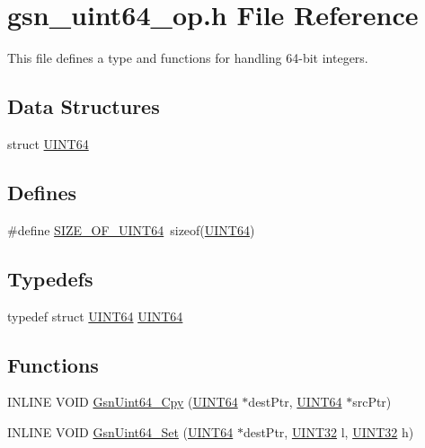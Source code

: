\hypertarget{a00601}{
\section{gsn\_\-uint64\_\-op.h File Reference}
\label{a00601}
}


This file defines a type and functions for handling 64-\/bit integers.  


\subsection*{Data Structures}
\begin{DoxyCompactItemize}
\item 
struct \hyperlink{a00462}{UINT64}
\end{DoxyCompactItemize}
\subsection*{Defines}
\begin{DoxyCompactItemize}
\item 
\#define \hyperlink{a00601_a6b300f9fe4aff65bbe06f909e44d1fdf}{SIZE\_\-OF\_\-UINT64}~sizeof(\hyperlink{a00462}{UINT64})
\end{DoxyCompactItemize}
\subsection*{Typedefs}
\begin{DoxyCompactItemize}
\item 
typedef struct \hyperlink{a00462}{UINT64} \hyperlink{a00660_ga2360b1c5f857c84c180aef97cc0612c9}{UINT64}
\end{DoxyCompactItemize}
\subsection*{Functions}
\begin{DoxyCompactItemize}
\item 
INLINE VOID \hyperlink{a00601_ade1b27552fa7c39d6de87bc2dd218eea}{GsnUint64\_\-Cpy} (\hyperlink{a00462}{UINT64} $\ast$destPtr, \hyperlink{a00462}{UINT64} $\ast$srcPtr)
\item 
INLINE VOID \hyperlink{a00601_a7ebf91991dd6ce5dc9342d7d09df4bb6}{GsnUint64\_\-Set} (\hyperlink{a00462}{UINT64} $\ast$destPtr, \hyperlink{a00660_gae1e6edbbc26d6fbc71a90190d0266018}{UINT32} l, \hyperlink{a00660_gae1e6edbbc26d6fbc71a90190d0266018}{UINT32} h)
\end{DoxyCompactItemize}
